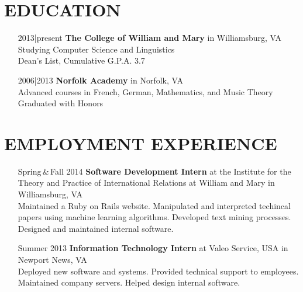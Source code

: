 \documentclass{res}     %
\begin{document}
\begin{resume}

\section{EDUCATION}          
\vspace{5mm}
\begin{itemize}[font=\itshape,align=parleft,labelwidth=3cm,leftmargin=2cm]
    \item[2013|present]
        \textbf{The College of William and Mary} in Williamsburg, VA
        \\ Studying Computer Science and Linguistics
        \\ Dean's List, Cumulative G.P.A. 3.7
    \item[2006|2013]
        \textbf{Norfolk Academy} in Norfolk, VA
        \\ Advanced courses in French, German, Mathematics, and Music Theory
        \\ Graduated with Honors
\end{itemize}

\section{EMPLOYMENT EXPERIENCE}
\vspace{5mm}
\begin{itemize}[font=\itshape,align=parleft,labelwidth=3cm,leftmargin=2cm]
    \item[Spring\,\&\,Fall 2014]
        \textbf{Software Development Intern}
        at the Institute for the Theory and Practice of International Relations
        at William and Mary
        in Williamsburg, VA
        \vspace{1mm} \\
        Maintained a Ruby on Rails website.
        Manipulated and interpreted techincal papers using machine learning algorithms.
        Developed text mining processes.
        Designed and maintained internal software.
    \item[Summer 2013]
        \textbf{Information Technology Intern}
        at Valeo Service, USA
        in Newport News, VA
        \vspace{1mm} \\
        Deployed new software and systems.
        Provided technical support to employees.
        Maintained company servers.
        Helped design internal software.
\end{itemize}


\end{resume}
\end{document}
